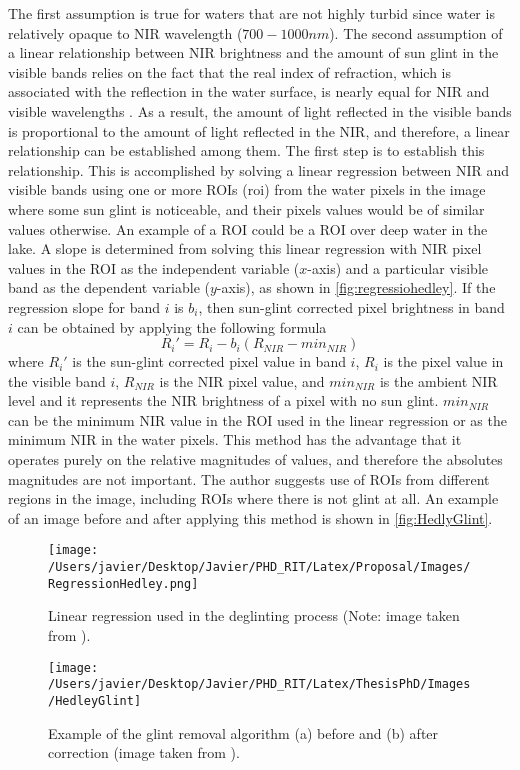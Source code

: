 The first assumption is true for waters that are not highly turbid since water is relatively opaque to NIR wavelength ($700-1000nm$). The second assumption of a linear relationship between NIR brightness and the amount of sun glint in the visible bands relies on the fact that the real index of refraction, which is associated with the reflection in the water surface, is nearly equal for NIR and visible wavelengths \citep{Mobley1994}. As a result, the amount of light reflected in the visible bands is proportional to the amount of light reflected in the NIR, and therefore, a linear relationship can be established among them. The first step is to establish this relationship. This is accomplished by solving a linear regression between NIR and visible bands using one or more ROIs (\gls{roi}) from the water pixels in the image where some sun glint is noticeable, and their pixels values would be of similar values otherwise. An example of a ROI could be a ROI over deep water in the lake. A slope is determined from solving this linear regression with NIR pixel values in the ROI as the independent variable ($x$-axis) and a particular visible band as the dependent variable ($y$-axis), as shown in \autoref{fig:regressiohedley}. If the regression slope for band $i$ is $b_i$, then sun-glint corrected pixel brightness in band $i$ can be obtained by applying the following formula
\begin{equation}\label{eq:deglint}
  R_i' = R_i - b_i(R_{NIR}-min_{NIR})
\end{equation}
where $R_i'$ is the sun-glint corrected pixel value in band $i$, $R_i$ is the pixel value in the visible band $i$, $R_{NIR}$ is the NIR pixel value, and $min_{NIR}$ is the ambient NIR level and it represents the NIR brightness of a pixel with no sun glint. $min_{NIR}$ can be the minimum NIR value in the ROI used in the linear regression or as the minimum NIR in the water pixels. This method has the advantage that it operates purely on the relative magnitudes of values, and therefore the absolutes magnitudes are not important. The author suggests use of ROIs from different regions in the image, including ROIs where there is not glint at all. An example of an image before and after applying this method is shown in \autoref{fig:HedlyGlint}.
\begin{figure}[htb]
  \centering
  \texttt{[image: /Users/javier/Desktop/Javier/PHD\_RIT/Latex/Proposal/Images/RegressionHedley.png]}
  \caption{Linear regression used in the deglinting process (Note: image taken from \citet{Hedley:2005}). \label{fig:regressiohedley} } 
\end{figure}
\begin{figure}[htb]
  \centering
    \texttt{[image: /Users/javier/Desktop/Javier/PHD\_RIT/Latex/ThesisPhD/Images/HedleyGlint]}
    \caption{Example of the glint removal algorithm (a) before and (b) after correction (image taken from \citet{Hedley:2005}).  \label{fig:HedlyGlint} }
\end{figure}


